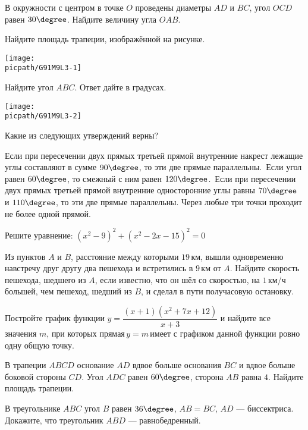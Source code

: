 \begin{class}[number=3]
\begin{listofex}
		\item В окружности с центром в точке \( O \) проведены диаметры \( AD \) и \( BC \), угол \( OCD \) равен \( 30\degree \). Найдите величину угла \( OAB \).
		\item 
		\begin{minipage}[t]{\bodywidth}
			Найдите площадь трапеции, изображённой на рисунке.
			\foranswer
		\end{minipage}
		\gapwidth
		\begin{minipage}[t]{\picwidth}
			\texttt{[image: \\picpath/G91M9L3-1]}
		\end{minipage}
		\item
		\begin{minipage}[t]{\bodywidth}
			Найдите угол \( ABC \). Ответ дайте в градусах.
			\foranswer
		\end{minipage}
		\gapwidth
		\begin{minipage}[t]{\picwidth}
			\texttt{[image: \\picpath/G91M9L3-2]}
		\end{minipage}
		\item Какие из следующих утверждений верны?
		\begin{tasks}
			\task Если при пересечении двух прямых третьей прямой внутренние накрест лежащие углы составляют в сумме \( 90\degree \), то эти две прямые параллельны.
			\task Если угол равен \( 60\degree \), то смежный с ним равен \( 120\degree \).
			\task Если при пересечении двух прямых третьей прямой внутренние односторонние углы равны \( 70\degree \) и \( 110\degree \), то эти две прямые параллельны.
			\task Через любые три точки проходит не более одной прямой.
		\end{tasks}
		\item Решите уравнение: \((x^2-9)^2+(x^2-2x-15)^2=0\)
		\item Из пунктов \( A \) и \( B \), расстояние между которыми \( 19 \) км, вышли одновременно навстречу друг другу два пешехода и встретились в \( 9 \) км от \( A \). Найдите скорость пешехода, шедшего из \( A \), если известно, что он шёл со скоростью, на \( 1 \) км/ч большей, чем пешеход, шедший из \( B \), и сделал в пути получасовую остановку.
		\item Постройте график функции \(y=\dfrac{(x+1)(x^2+7x+12)}{x+3}\) и найдите все значения \( m \), при которых прямая \( y=m \) имеет с графиком данной функции ровно одну общую точку.
		\item В трапеции \( ABCD \) основание \( AD \) вдвое больше основания \( BC \) и вдвое больше боковой стороны \( CD \). Угол \( ADC \) равен \( 60\degree \), сторона \( AB \) равна \( 4 \). Найдите площадь трапеции.
		\item В треугольнике \( ABC \) угол \( B \) равен \( 36\degree \), \( AB=BC \), \( AD \) --- биссектриса. Докажите, что треугольник \( ABD \) --- равнобедренный.
	\end{listofex}
\end{class}

